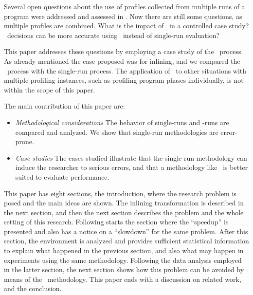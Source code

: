 
Several open questions about the use of profiles collected from multiple runs of a program were addressed and assessed in \cite{BerubeISPASS12}. Now there are still some questions, as multiple profiles are combined. What is the impact of \CP\ in a controlled case study? \FDO\ decisions can be more accurate using \CP\ instead of single-run evaluation?

This paper addresses these questions by employing a case study of the \CP\ process. As already mentioned the case proposed was for inlining, and we compared the \CP\ process with the single-run process. The application of \CP\ to other situations with multiple profiling instances, such as profiling program phases individually, is not within the scope of this paper.


The main contribution of this paper are:
\begin{itemize}
\item {\it Methodological considerations} The behavior of single-runs and \CP-runs are compared and analyzed. We show that single-run methodologies are error-prone.

\item {\it Case studies} The cases studied illustrate that the single-run methodology can induce the researcher to serious errors, and that a methodology like \CP\ is better suited to evaluate performance.

\end{itemize}


This paper has eight sections, the introduction, where the research problem is posed and the main ideas are shown. The inlining transformation is described in the next section, and then the next section describes the problem and the whole setting of this research. Following starts the section where the ``speedup'' is presented and also has a notice on a ``slowdown'' for the same problem. After this section, the environment is analyzed and provides sufficient statistical information to explain what happened in the previous section, and also what may happen in experiments using the same methodology. Following the data analysis employed in the latter section, the next section shows how this problem can be avoided by means of the \CP\ methodology. This paper ends with a discussion on related work, and the conclusion.
